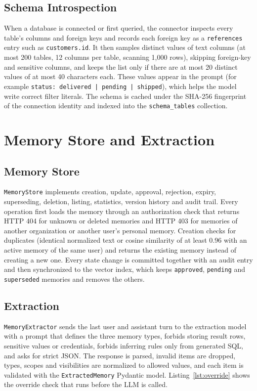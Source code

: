 \subsection{Schema Introspection}
When a database is connected or first queried, the connector inspects every table's
columns and foreign keys and records each foreign key as a \texttt{references} entry such as
\texttt{customers.id}. It then samples distinct values of text columns (at most 200 tables,
12 columns per table, scanning 1,000 rows), skipping foreign-key and sensitive columns, and
keeps the list only if there are at most 20 distinct values of at most 40 characters each.
These values appear in the prompt (for example \texttt{status: delivered | pending |
shipped}), which helps the model write correct filter literals. The schema is cached under
the SHA-256 fingerprint of the connection identity and indexed into the
\texttt{schema\_tables} collection.

\section{Memory Store and Extraction}

\subsection{Memory Store}
\texttt{MemoryStore} implements creation, update, approval, rejection, expiry, superseding,
deletion, listing, statistics, version history and audit trail. Every operation first loads
the memory through an authorization check that returns HTTP 404 for unknown or deleted
memories and HTTP 403 for memories of another organization or another user's personal
memory. Creation checks for duplicates (identical normalized text or cosine similarity of
at least 0.96 with an active memory of the same user) and returns the existing memory
instead of creating a new one. Every state change is committed together with an audit
entry and then synchronized to the vector index, which keeps \texttt{approved},
\texttt{pending} and \texttt{superseded} memories and removes the others.

\subsection{Extraction}
\texttt{MemoryExtractor} sends the last user and assistant turn to the extraction model
with a prompt that defines the three memory types, forbids storing result rows, sensitive
values or credentials, forbids inferring rules only from generated SQL, and asks for strict
JSON. The response is parsed, invalid items are dropped, types, scopes and visibilities are
normalized to allowed values, and each item is validated with the \texttt{ExtractedMemory}
Pydantic model. Listing~\ref{lst:override} shows the override check that runs before the
LLM is called.

